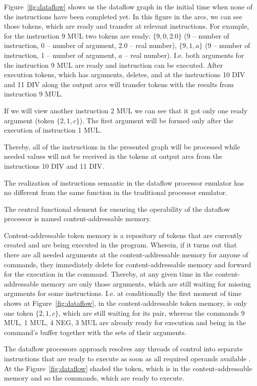\documentclass[
11pt,%
tightenlines,%
twoside,%
onecolumn,%
nofloats,%
nobibnotes,%
nofootinbib,%
superscriptaddress,%
noshowpacs,%
centertags]%
{revtex4}
\begin{document}
Figure~\ref{fig:dataflow} shows us the dataflow graph in the initial time when none of the instructions have been completed yet.
In this figure in the arcs, we can see those tokens, which are ready and transfer at relevant instructions.
For example, for the instruction 9 MUL two tokens are ready: $\{9, 0, 2.0\}$ (9 -- number of instruction, 0 -- number of argument, 2.0 -- real number), $\{9, 1, a\}$ (9 -- number of instruction, 1 -- number of argument, $a$ -- real number).
I.e. both arguments for the instruction 9 MUL are ready and instruction can be executed.
After execution tokens, which has arguments, deletes, and at the instructions 10 DIV and 11 DIV along the output arcs will transfer tokens with the results from instruction 9 MUL.

If we will view another instruction 2 MUL we can see that it got only one ready argument (token $\{2, 1, c\}$).
The first argument will be formed only after the execution of instruction 1 MUL.

Thereby, all of the instructions in the presented graph will be processed while needed values will not be received in the tokens at output arcs from the instructions 10 DIV and 11 DIV.

The realization of instructions semantic in the dataflow processor emulator has no different from the same function in the traditional processor emulator.

The central functional element for ensuring the operability of the dataflow processor is named content-addressable memory.

Content-addressable token memory is a repository of tokens that are currently created and are being executed in the program.
Wherein, if it turns out that there are all needed arguments at the content-addressable memory for anyone of commands, they immediately delete for content-addressable memory and forward for the execution in the command.
Thereby, at any given time in the content-addressable memory are only those arguments, which are still waiting for missing arguments for some instructions.
I.e. at conditionally the first moment of time shows at Figure~\ref{fig:dataflow}, in the content-addressable token memory, is only one token $\{2, 1, c\}$, which are still waiting for its pair, whereas the commands 9 MUL, 1 MUL, 4 NEG, 3 MUL are already ready for execution and being in the command’s buffer together with the sets of their arguments.

The dataflow processors approach resolves any threads of control into separate instructions that are ready to execute as soon as all required operands available \cite{silc}. 
At the Figure~\ref{fig:dataflow} shaded the token, which is in the content-addressable memory and so the commands, which are ready to execute.
\end{document}
